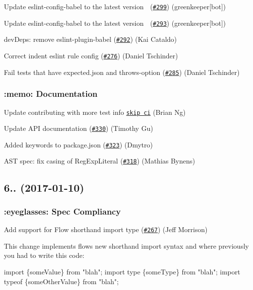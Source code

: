 Update eslint-\/config-\/babel to the latest version 🚀 (\href{https://github.com/babel/babylon/pull/299}{\tt \#299}) (greenkeeper\mbox{[}bot\mbox{]})

Update eslint-\/config-\/babel to the latest version 🚀 (\href{https://github.com/babel/babylon/pull/293}{\tt \#293}) (greenkeeper\mbox{[}bot\mbox{]})

dev\+Deps\+: remove eslint-\/plugin-\/babel (\href{https://github.com/babel/babylon/pull/292}{\tt \#292}) (Kai Cataldo)

Correct indent eslint rule config (\href{https://github.com/babel/babylon/pull/276}{\tt \#276}) (Daniel Tschinder)

Fail tests that have expected.\+json and throws-\/option (\href{https://github.com/babel/babylon/pull/285}{\tt \#285}) (Daniel Tschinder)

\subsubsection*{\+:memo\+: Documentation}

Update contributing with more test info \href{[#355](https://github.com/babel/babylon/pull/355)}{\tt skip ci} (Brian Ng)

Update A\+PI documentation (\href{https://github.com/babel/babylon/pull/330}{\tt \#330}) (Timothy Gu)

Added keywords to package.\+json (\href{https://github.com/babel/babylon/pull/323}{\tt \#323}) (Dmytro)

A\+ST spec\+: fix casing of {\ttfamily Reg\+Exp\+Literal} (\href{https://github.com/babel/babylon/pull/318}{\tt \#318}) (Mathias Bynens)

\subsection*{6.. (2017-\/01-\/10)}

\subsubsection*{\+:eyeglasses\+: Spec Compliancy}

Add support for Flow shorthand import type (\href{https://github.com/babel/babylon/pull/267}{\tt \#267}) (Jeff Morrison)

This change implements flows new shorthand import syntax and where previously you had to write this code\+:


\begin{DoxyCode}
import \{someValue\} from "blah";
import type \{someType\} from "blah";
import typeof \{someOtherValue\} from "blah";
\end{DoxyCode}


